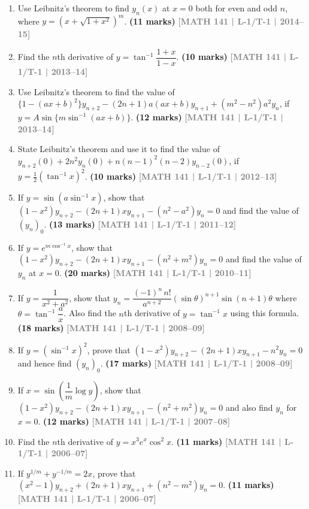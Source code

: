 \documentclass[12pt,a4paper]{article}
\newcommand{\yr}[1]{\hfill\textcolor{gray}{\small\textbf{[#1]}}}
\newcommand{\mk}[1]{\textcolor{orange!70!black}{\small\textbf{(#1 marks)}}}
\begin{document}
\begin{enumerate}
\item Use Leibnitz's theorem to find $y_{n}(x)$ at $x=0$ both for even and odd $n$, where $y=\left(x+\sqrt{1+x^{2}}\right)^{m}$.
\mk{11} \yr{MATH 141 | L-1/T-1 | 2014--15}

\item Find the $n$th derivative of $y=\tan^{-1}\!\dfrac{1+x}{1-x}$.
\mk{10} \yr{MATH 141 | L-1/T-1 | 2013--14}

\item Use Leibnitz's theorem to find the value of $\{1-(ax+b)^{2}\}y_{n+2}-(2n+1)a(ax+b)y_{n+1}+(m^{2}-n^{2})a^{2}y_{n}$, if $y=A\sin\{m\sin^{-1}(ax+b)\}$.
\mk{12} \yr{MATH 141 | L-1/T-1 | 2013--14}

\item State Leibnitz's theorem and use it to find the value of $y_{n+2}(0)+2n^{2}y_{n}(0)+n(n-1)^{2}(n-2)y_{n-2}(0)$, if $y=\tfrac{1}{2}(\tan^{-1}x)^{2}$.
\mk{10} \yr{MATH 141 | L-1/T-1 | 2012--13}

\item If $y=\sin(a\sin^{-1}x)$, show that $(1-x^{2})y_{n+2}-(2n+1)xy_{n+1}-(n^{2}-a^{2})y_{n}=0$ and find the value of $(y_{n})_{0}$.
\mk{13} \yr{MATH 141 | L-1/T-1 | 2011--12}

\item If $y=e^{m\cos^{-1}x}$, show that $(1-x^{2})y_{n+2}-(2n+1)xy_{n+1}-(n^{2}+m^{2})y_{n}=0$ and find the value of $y_{n}$ at $x=0$.
\mk{20} \yr{MATH 141 | L-1/T-1 | 2010--11}

\item If $y=\dfrac{1}{x^{2}+a^{2}}$, show that $y_{n}=\dfrac{(-1)^{n}\,n!}{a^{n+2}}(\sin\theta)^{n+1}\sin(n+1)\theta$ where $\theta=\tan^{-1}\!\dfrac{a}{x}$. Also find the $n$th derivative of $y=\tan^{-1}x$ using this formula.
\mk{18} \yr{MATH 141 | L-1/T-1 | 2008--09}

\item If $y=(\sin^{-1}x)^{2}$, prove that $(1-x^{2})y_{n+2}-(2n+1)xy_{n+1}-n^{2}y_{n}=0$ and hence find $(y_{n})_{0}$.
\mk{17} \yr{MATH 141 | L-1/T-1 | 2008--09}

\item If $x=\sin\!\left(\dfrac{1}{m}\log y\right)$, show that $(1-x^{2})y_{n+2}-(2n+1)xy_{n+1}-(n^{2}+m^{2})y_{n}=0$ and also find $y_{n}$ for $x=0$.
\mk{12} \yr{MATH 141 | L-1/T-1 | 2007--08}

\item Find the $n$th derivative of $y=x^{3}e^{x}\cos^{2}x$.
\mk{11} \yr{MATH 141 | L-1/T-1 | 2006--07}

\item If $y^{1/m}+y^{-1/m}=2x$, prove that $(x^{2}-1)y_{n+2}+(2n+1)xy_{n+1}+(n^{2}-m^{2})y_{n}=0$.
\mk{11} \yr{MATH 141 | L-1/T-1 | 2006--07}


\end{enumerate}
\end{document}

